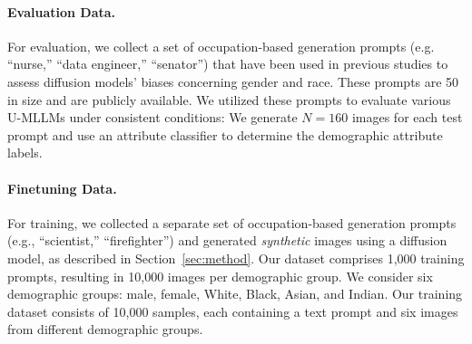 \paragraph{Evaluation Data.}
For evaluation, we collect a set of occupation-based generation prompts (e.g. ``nurse,'' ``data engineer,'' ``senator'') that have been used in previous studies\cite{shen2024finetuningtexttoimagediffusionmodels} to assess diffusion models' biases concerning gender and race. These prompts are 50 in size and are publicly available. We utilized these prompts to evaluate various U-MLLMs under consistent conditions: We generate $N = 160$ images for each test prompt and use an attribute classifier\cite{shen2024finetuningtexttoimagediffusionmodels} to determine the demographic attribute labels.
\vspace{-1.5em}

\paragraph{Finetuning Data.}
For training, we collected a separate set of occupation-based generation prompts\cite{shen2024finetuningtexttoimagediffusionmodels} (e.g., ``scientist,'' ``firefighter'') and generated \emph{synthetic} images using a diffusion model, as described in Section~\ref{sec:method}. Our dataset comprises 1,000 training prompts, resulting in 10,000 images per demographic group. We consider six demographic groups: male, female, White, Black, Asian, and Indian. Our training dataset consists of 10,000 samples, each containing a text prompt and six images from different demographic groups.
 

